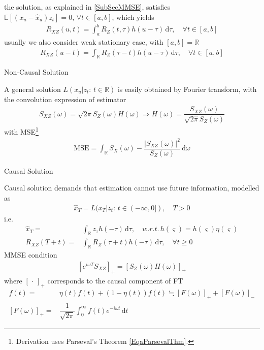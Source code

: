 the solution, as explained in \autoref{SubSecMMSE}, satisfies $ \mathbb{E}\left[ (x_u-\hat{x}_u)z_t \right] =0,\,\forall t\in[a,b] $, which yields
\begin{align}
    R_{XZ}(u,t)=\int _a^b R_Z(t,\tau)h(u-\tau) \,\mathrm{d}\tau,\quad \forall t\in[a,b]
\end{align}
usually we also consider weak stationary case, with $ [a,b]=\mathbb{R} $
\begin{align}
    R_{XZ}(u-t)=\int_\mathbb{R} R_Z(\tau -t)h(u-\tau)  \,\mathrm{d}\tau ,\quad \forall t\in[a,b]
\end{align}


\begin{point}
    Non-Causal Solution
\end{point}
A general solution $ L(x_u|z_t:\,t\in\mathbb{R}) $ is easily obtained by Fourier transform, with the convolution expression of estimator
\begin{align}
    S_{XZ }(\omega )= \sqrt{2\pi}S_Z(\omega )H(\omega )\Rightarrow H(\omega )=\dfrac{S_{XZ} (\omega )}{\sqrt{2\pi}S_Z(\omega )}
\end{align}
with MSE\footnote{Derivation uses Parseval's Theorem \autoref{EqaParsevalThm}.}
\begin{align}
    \mathrm{MSE}=\int _\mathbb{R} S_X(\omega )-\dfrac{|S_{XZ}(\omega )|^2}{S_Z(\omega )} \,\mathrm{d}\omega   
\end{align}

\begin{point}
    Causal Solution
\end{point}

Causal solution demands that estimation cannot use future information, modelled as
\begin{align}
    \hat{x}_{T}=L(x_T|z_t:\,t\in(-\infty, 0]),\quad T>0 
\end{align}
i.e. 
\begin{align}
    \hat{x}_T=&\int _\mathbb{R} z_\tau h(-\tau) \,\mathrm{d}\tau ,\quad w.r.t.\, h(\varsigma)=h(\varsigma)\eta(\varsigma) \\
    R_{XZ}(T+t)=&\int _\mathbb{R}R_Z(\tau+t)h(-\tau) \,\mathrm{d}\tau ,\quad \forall t\geq 0
\end{align}
MMSE condition
\begin{align}
    \left[ e^{i\omega T}S_{XZ}\right]_+ = \left[S_Z(\omega )H(\omega ) \right]_+
\end{align}
where $[\, \cdot \, ]_+ $ corresponds to the causal component of FT
\begin{align}
     f(t)=&\eta(t)f(t)+(1-\eta(t))f(t)\fallingdotseq [F(\omega )]_+ + [F(\omega )]_-\\
    [F(\omega )]_+=&\dfrac{1}{\sqrt{2\pi}}\int _0^\infty f(t)e^{-i\omega t} \,\mathrm{d}t
\end{align}

